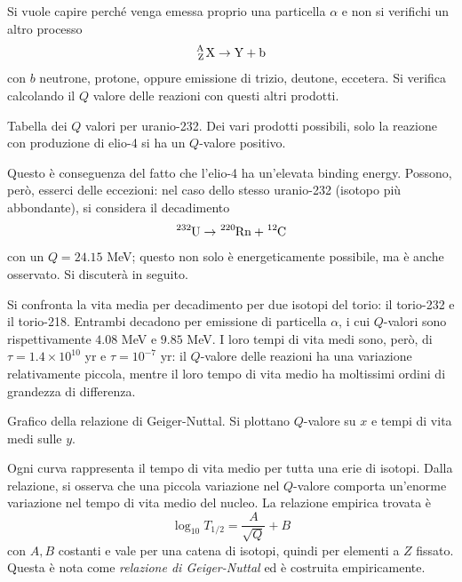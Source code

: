 \documentclass[11pt, a4paper]{scrartcl}
\theoremstyle{style}
\newenvironment{boxenv}[1][]{
    \begin{eqbox}[#1]
    }{
   \end{eqbox}
}
\numberwithin{equation}{subsection}
\begin{document}
Si vuole capire perch\'e venga emessa proprio una particella $\alpha $ e non si verifichi un altro processo 
\[
	\ce{_Z^A X}\to \ce{Y + b}
\] 
con $b$ neutrone, protone, oppure emissione di trizio, deutone, eccetera.
Si verifica calcolando il $Q$ valore delle reazioni con questi altri prodotti. 
\begin{boxenv}[]
Tabella dei $Q$ valori per uranio-232. Dei vari prodotti possibili, solo la reazione con produzione di elio-4 si ha un $Q$-valore positivo.
\end{boxenv}

\noindent Questo \`e conseguenza del fatto che l'elio-4 ha un'elevata binding energy.
Possono, per\`o, esserci delle eccezioni: nel caso dello stesso uranio-232 (isotopo pi\`u abbondante), si considera il decadimento 
\[
	\ce{^{232}U} \to  \ce{^{220}Rn + ^{12}C}
\] 
con un $Q = 24.15$ MeV; questo non solo \`e energeticamente possibile, ma \`e anche osservato. 
Si discuter\`a in seguito.

Si confronta la vita media per decadimento per due isotopi del torio: il torio-232 e il torio-218.
Entrambi decadono per emissione di particella $\alpha $, i cui $Q$-valori sono rispettivamente $4.08$ MeV e $9.85$ MeV.
I loro tempi di vita medi sono, per\`o, di $\tau  = 1.4 \times 10^{10}$ yr e $\tau = 10^{-7}$ yr: il $Q$-valore delle reazioni ha una variazione relativamente piccola, mentre il loro tempo di vita medio ha moltissimi ordini di grandezza di differenza.
\begin{boxenv}[]
Grafico della relazione di Geiger-Nuttal.
Si plottano $Q$-valore su $x$ e tempi di vita medi sulle $y$.
\end{boxenv}

\noindent Ogni curva rappresenta il tempo di vita medio per tutta una erie di isotopi.
Dalla relazione, si osserva che una piccola variazione nel $Q$-valore comporta un'enorme variazione nel tempo di vita medio del nucleo.
La relazione empirica trovata \`e 
\[
\log_{10} T_{1 / 2} = \frac{A}{\sqrt{Q} } + B
\] 
con $A,B$ costanti e vale per una catena di isotopi, quindi per elementi a $Z$ fissato.
Questa \`e nota come \textit{relazione di Geiger-Nuttal} ed \`e costruita empiricamente.
\end{document}

